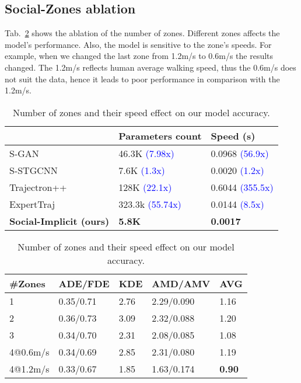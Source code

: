 \documentclass[runningheads]{llncs}
\begin{document}
\subsection{Social-Zones ablation} Tab.~\ref{tab:zones} shows the ablation of the number of zones. Different zones affects the model’s performance. Also, the model is sensitive to the zone's speeds. For example, when we changed the last zone from 1.2m/s to 0.6m/s the results changed. The 1.2m/s reflects human average walking speed, thus the 0.6m/s does not suit the data, hence it leads to poor performance in comparison with the 1.2m/s.
\begin{table}[!htb]
\begin{minipage}{.48\textwidth}
    \tiny
    \caption{Parameters counts and mean inference speed reported, benchmarked on the GTX1080Ti.}
    \label{tab:speed_and_parameters}
      \centering
    \begin{tabular}{l|l|l}
& Parameters count & Speed (s) \\ \hline
    S-GAN~\cite{gupta2018social}      & 46.3K \textcolor{blue}{(7.98x)}                  & 0.0968 \textcolor{blue}{(56.9x)}              \\ \hline
    S-STGCNN~\cite{mohamed2020social}   & 7.6K  \textcolor{blue}{(1.3x)}                & 0.0020  \textcolor{blue}{(1.2x) }            \\ \hline
    Trajectron++~\cite{salzmann2020trajectron++}    & 128K  \textcolor{blue}{(22.1x)}                 & 0.6044  \textcolor{blue}{(355.5x)}             \\ \hline
    ExpertTraj~\cite{zhao2021you}      & 323.3k \textcolor{blue}{(55.74x)}                & 0.0144  \textcolor{blue}{(8.5x) }            \\ \hline
    \bottomrule
    \textbf{Social-Implicit (ours)} & \textbf{5.8K}              & \textbf{0.0017 }             \\ \hline
    \end{tabular}
    \end{minipage}\hfill
    \begin{minipage}{.48\textwidth}
    \scriptsize
      \centering
        \caption{Number of zones and their speed effect on our model accuracy.}
        \label{tab:zones}
        \begin{tabular}{l|l|l|l|l}
        \#Zones              & ADE/FDE   & KDE  & AMD/AMV    & AVG  \\ 
        \hline
        1                  & 0.35/0.71 & 2.76 & 2.29/0.090 & 1.16           \\
        2                  & 0.36/0.73 & 3.09 & 2.32/0.088 & 1.20           \\
        3                  & 0.34/0.70 & 2.31 & 2.08/0.085 & 1.08           \\
        4@0.6m/s & 0.34/0.69 & 2.85 & 2.31/0.080  & 1.19           \\ 
        \hline
        4@1.2m/s& 0.33/0.67 & 1.85 & 1.63/0.174 & \textbf{0.90}\\
        \hline
        \end{tabular}
    \end{minipage} 
\end{table}
\end{document}
